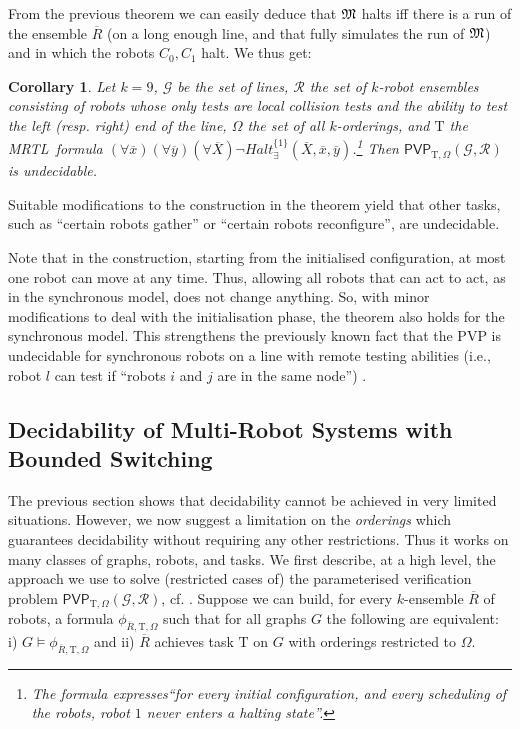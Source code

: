 \documentclass{llncs}
\newtheorem{corollary}{Corollary}
\def\MRTL{\textsf{MRTL}}
\def\gclass{\mathcal{G}}
\def\rclass{\mathcal{R}}
\def\T{\mathrm{T}}
\def\PVP{\mathsf{PVP}}
\newcommand{\tup}[1]{\overline{#1}}
\newcommand{\counter}{\ensuremath{C}}
\begin{document}
From the previous theorem we can easily deduce that $\mathfrak{M}$ halts iff there is a run of the ensemble $\tup{R}$ (on a long enough line, and that fully simulates the run of $\mathfrak{M}$) and in which the robots $\counter_0, \counter_1$ halt.  We thus get:
\begin{corollary}
Let $k = 9$, $\gclass$ be the set of lines, $\rclass$ the set of $k$-robot ensembles consisting of robots whose only tests are local collision tests and the ability to test the left (resp. right) end of the line, $\Omega$ the set of all $k$-orderings, and $\T$ the \MRTL\ formula  $(\forall \tup{x}) (\forall \tup{y}) (\forall \tup{X}) \neg Halt^{\{1\}}_\exists(\tup{X},\tup{x},\tup{y})$.\footnote{The formula expresses``for every initial configuration, and every scheduling of the robots, robot $1$ never enters a halting state''.}
 Then $\PVP_{\T,\Omega}(\gclass,\rclass)$ is undecidable.
\end{corollary}
Suitable modifications to the construction in the theorem yield that other tasks, such as ``certain robots gather'' or ``certain robots reconfigure'', are undecidable.

\begin{remark} \label{rem:synch}
Note that in the construction, starting from the initialised configuration, at most one robot can move at any time. Thus, allowing all robots that can act to act, as in the synchronous model, does not change anything. So, with minor modifications to deal with the initialisation phase, the theorem also holds for the synchronous model. This strengthens the previously known fact that the PVP is undecidable for synchronous robots on a line with remote testing abilities 
(i.e., robot $l$ can test if ``robots $i$ and $j$ are in the same node'') \cite{Rubin15AAMAS}.
\end{remark}

\subsection{Decidability of Multi-Robot Systems with Bounded Switching} \label{sec:PVPdec}
The previous section shows that decidability cannot be achieved in very limited situations. However, we now suggest a limitation on the {\em orderings} which guarantees decidability without requiring any other restrictions. Thus it works on many classes of graphs, robots, and tasks.
%
We first describe, at a high level, the approach we use to solve (restricted cases of) the parameterised verification problem $\PVP_{\T,\Omega}(\gclass,\rclass)$, cf. \cite{Rubin15AAMAS}.
Suppose we can build, for every $k$-ensemble $\tup{R}$ of robots, a formula $\phi_{\tup{R},\T,\Omega}$ such that for all graphs $G$ the following are equivalent:
i) $G \models \phi_{\tup{R},\T,\Omega}$ and ii)
 $\tup{R}$ achieves task $\T$ on $G$ with orderings restricted to $\Omega$.
\end{document}
